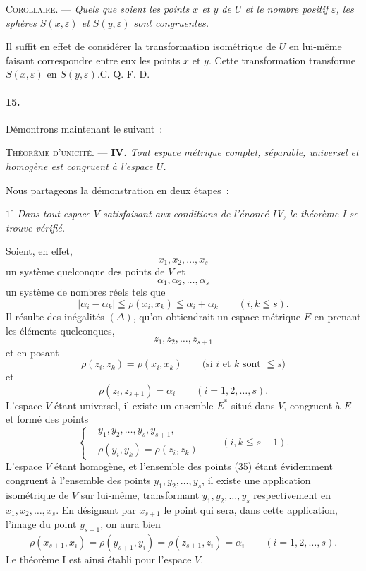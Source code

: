 \documentclass[a4paper,12pt]{amsart}
\newcommand{\srcpage}[1]{} %
\begin{document}
\textsc{Corollaire.} --- \textit{Quels que soient les points $x$ et $y$ de $U$ et le nombre positif $\varepsilon$, les sphères $S(x,\varepsilon)$ et $S(y,\varepsilon)$ sont congruentes.}

Il suffit en effet de considérer la transformation isométrique de $U$ en lui-même faisant correspondre entre eux les points $x$ et $y$. Cette transformation transforme $S(x,\varepsilon)$ en $S(y,\varepsilon)$.\hfill C. Q. F. D.

\paragraph{15.}
Démontrons maintenant le suivant~:

\textsc{Théorème d'unicité.} --- \textbf{IV.} \textit{Tout espace métrique complet, séparable, universel et homogène est congruent à l'espace $U$.}

Nous partageons la démonstration en deux étapes~:
\srcpage{77}

$1^\circ$ \textit{Dans tout espace $V$ satisfaisant aux conditions de l'énoncé IV, le théorème I se trouve vérifié.}

Soient, en effet,
\begin{equation}\tag{35}
x_1,x_2,\dots,x_s
\end{equation}
un système quelconque des points de $V$ et
\begin{equation}\tag{36}
\alpha_1,\alpha_2,\dots,\alpha_s
\end{equation}
un système de nombres réels tels que
\begin{equation}\tag{$\Delta$}
|\alpha_i-\alpha_k|\leqq\rho(x_i,x_k)\leqq\alpha_i+\alpha_k\qquad(i,k\leqq s).
\end{equation}
Il résulte des inégalités $(\Delta)$, qu'on obtiendrait un espace métrique $E$ en prenant les éléments quelconques,
\[
z_1,z_2,\dots,z_{s+1}
\]
et en posant
\begin{equation}\tag{37}
\rho(z_i,z_k)=\rho(x_i,x_k)\qquad\text{(si $i$ et $k$ sont $\leqq s$)}
\end{equation}
et
\begin{equation}\tag{38}
\rho(z_i,z_{s+1})=\alpha_i\qquad(i=1,2,\dots,s).
\end{equation}
L'espace $V$ étant universel, il existe un ensemble $E^*$ situé dans $V$, congruent à $E$ et formé des points
\begin{equation}\tag{39}
\left\{\begin{aligned}
&y_1,y_2,\dots,y_s,y_{s+1},\\
&\rho(y_i,y_k)=\rho(z_i,z_k)
\end{aligned}\right.\qquad(i,k\leqq s+1).
\end{equation}
L'espace $V$ étant homogène, et l'ensemble des points (35) étant évidemment congruent à l'ensemble des points $y_1,y_2,\dots,y_s$, il existe une application isométrique de $V$ sur lui-même, transformant $y_1,y_2,\dots,y_s$ respectivement en $x_1,x_2,\dots,x_s$. En désignant par $x_{s+1}$ le point qui sera, dans cette application, l'image du point $y_{s+1}$, on aura bien
\[
\rho(x_{s+1},x_i)=\rho(y_{s+1},y_i)=\rho(z_{s+1},z_i)=\alpha_i\qquad(i=1,2,\dots,s).
\]
Le théorème I est ainsi établi pour l'espace $V$.
\end{document}
